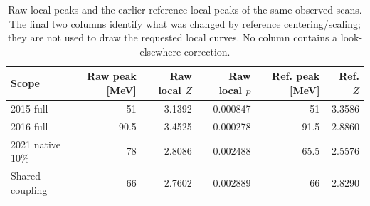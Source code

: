 \begin{table}[htbp]\centering\small
\begin{tabular}{lrrrrr}\toprule
Scope & Raw peak [MeV] & Raw local $Z$ & Raw local $p$ & Ref. peak [MeV] & Ref. $Z$\\\midrule
2015 full & 51 & 3.1392 & 0.000847 & 51 & 3.3586 \\
2016 full & 90.5 & 3.4525 & 0.000278 & 91.5 & 2.8860 \\
2021 native 10\% & 78 & 2.8086 & 0.002488 & 65.5 & 2.5576 \\
Shared coupling & 66 & 2.7602 & 0.002889 & 66 & 2.8290 \\
\bottomrule\end{tabular}
\caption{Raw local peaks and the earlier reference-local peaks of the same observed scans. The final two columns identify what was changed by reference centering/scaling; they are not used to draw the requested local curves. No column contains a look-elsewhere correction.}
\label{tab:raw_local_peaks}
\end{table}
